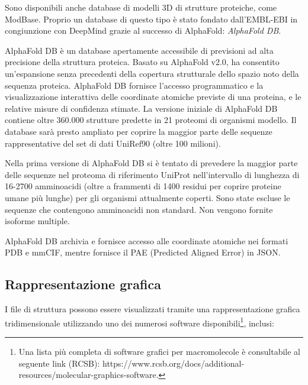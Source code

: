 \par Sono disponibili anche database di modelli 3D di strutture proteiche, come ModBase. Proprio un database di questo tipo è stato fondato dall'EMBL-EBI in congiunzione con DeepMind grazie al successo di AlphaFold: \textit{AlphaFold DB}.

\par AlphaFold DB è un database apertamente accessibile di previsioni ad alta precisione della struttura proteica. Basato su AlphaFold v2.0, ha consentito un'espansione senza precedenti della copertura strutturale dello spazio noto della sequenza proteica. AlphaFold DB fornisce l'accesso programmatico e la visualizzazione interattiva delle coordinate atomiche previste di una proteina, e le relative misure di confidenza stimate. La versione iniziale di AlphaFold DB contiene oltre 360.000 strutture predette in 21 proteomi di organismi modello. Il database sarà presto ampliato per coprire la maggior parte delle sequenze rappresentative del set di dati UniRef90 (oltre 100 milioni)\supercite{varadi2021alphafold}.

\par Nella prima versione di AlphaFold DB si è tentato di prevedere la maggior parte delle sequenze nel proteoma di riferimento UniProt nell'intervallo di lunghezza di 16-2700 amminoacidi (oltre a frammenti di 1400 residui per coprire proteine umane più lunghe) per gli organismi attualmente coperti. Sono state escluse le sequenze che contengono amminoacidi non standard. Non vengono fornite isoforme multiple.

\par AlphaFold DB archivia e fornisce accesso alle coordinate atomiche nei formati PDB e mmCIF, mentre fornisce il PAE (Predicted Aligned Error) in JSON.



\subsection{Rappresentazione grafica}

I file di struttura possono essere visualizzati tramite una rappresentazione grafica tridimensionale utilizzando uno dei numerosi software disponibili\footnote{Una lista più completa di software grafici per macromolecole è consultabile al seguente link (RCSB): https://www.rcsb.org/docs/additional-resources/molecular-graphics-software.}, inclusi:

